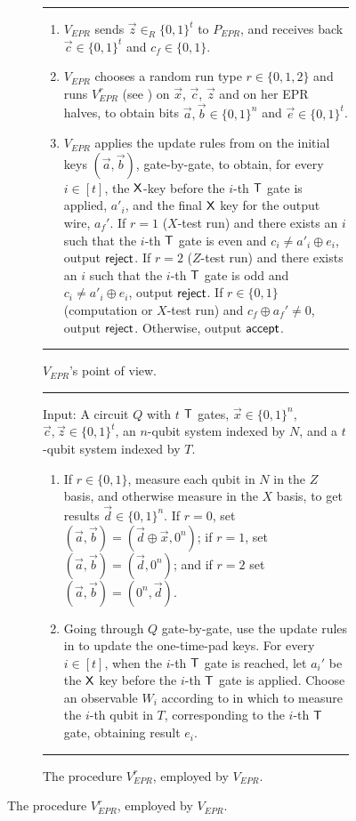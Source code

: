 \documentclass{toc}
\begin{document}
\begin{figure}[htbp]
  \begin{subfigure}{\textwidth}
\rule[1ex]{\textwidth}{0.5pt}
\begin{enumerate}
\item $V_{EPR}$ sends $\vec{z}\in_R\{0,1\}^t$ to $P_{EPR}$,
and receives back $\vec{c}\in\{0,1\}^t$ and $c_f\in\{0,1\}$.
\item $V_{EPR}$ chooses a random run type $r\in\{0,1,2\}$ and runs $V_{EPR}^r$ (see ) on $\vec{x}$, $\vec{c}$, $\vec{z}$ and on her EPR halves, to obtain bits $\vec{a},\vec{b}\in\{0,1\}^n$ and $\vec{e}\in\{0,1\}^t$. 
\item $V_{EPR}$ applies the update rules from  on the initial keys $(\vec{a},\vec{b})$, gate-by-gate, to obtain, for every $i\in [t]$, the $\sf X$-key before the $i$-th $\sf T$ gate is applied, $a'_i$, and the final $\sf X$ key for the output wire, $a_f'$. If $r=1$ ($X$-test run) and there exists an $i$ such that the $i$-th $\sf T$ gate is even and $c_i\neq a'_i\oplus e_i$, output $\sf reject$. If $r=2$ ($Z$-test run) and there exists an $i$ such that the $i$-th $\sf T$ gate is odd and $c_i\neq a'_i\oplus e_i$, output $\sf reject$. If $r\in\{0,1\}$ (computation or $X$-test run) and $c_f\oplus a_f'\neq 0$, output $\sf reject$. Otherwise, output $\sf accept$. 
\end{enumerate}
\rule[2ex]{\textwidth}{0.5pt} %
    \caption{ $V_{EPR}$'s point of view.}
  \label{fig:original-protocol-VEPR}
    \end{subfigure}

\vspace{0.15cm}      %

\begin{subfigure}{\textwidth}
\rule[1ex]{\textwidth}{0.5pt}
\raggedright
Input: A circuit $Q$ with $t$ $\sf T$ gates, $\vec{x}\in\{0,1\}^n$, $\vec{c},\vec{z}\in\{0,1\}^t$, an $n$-qubit system indexed by $N$, and a $t$-qubit system indexed by $T$.
\begin{enumerate}
\item If $r\in\{0,1\}$, measure each qubit in $N$ in the $Z$ basis, and otherwise measure in the $X$ basis, to get results $\vec{d}\in\{0,1\}^n$. If $r=0$, set $(\vec{a},\vec{b})=(\vec{d}\oplus \vec{x},0^n)$; if $r=1$, set $(\vec{a},\vec{b})=(\vec{d},0^n)$; and if $r=2$ set $(\vec{a},\vec{b})=(0^n,\vec{d})$. 
\item Going through $Q$ gate-by-gate, use the update rules in
 to update the one-time-pad keys. For every
    $i\in[t]$, when the $i$-th $\sf T$ gate is reached, let $a_i'$ be the $\sf
    X$ key before the $i$-th $\sf T$ gate is applied. Choose an observable $W_i$ according to  in which to measure the $i$-th qubit in $T$, corresponding to the $i$-th $\sf T$ gate, obtaining result $e_i$.  
\end{enumerate}
\rule[2ex]{\textwidth}{0.5pt} %
\caption{ The procedure $V_{EPR}^r$, employed by $V_{EPR}$.  }
  \label{fig:original-protocol-VEPRr}
\end{subfigure}


\end{figure}
\end{document}
